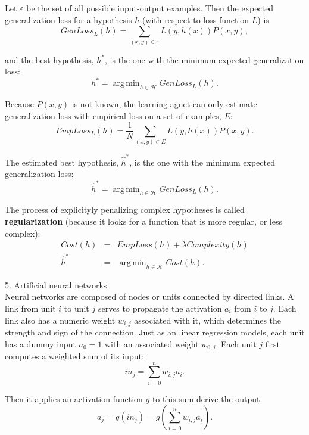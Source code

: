 \documentclass[12pt]{article}
\DeclareMathOperator*{\argmin}{arg\,min}
\begin{document}
Let $\varepsilon$ be the set of all possible input-output examples. Then the expected generalization loss for a hypothesis $h$ (with respect to loss function $L$) is
\begin{equation*}
  GenLoss_L(h) = \sum_{(x,y) \in \varepsilon} L(y,h(x)) P(x,y),
\end{equation*}

and the best hypothesis, $h^*$, is the one with the minimum expected generalization loss:
\begin{equation*}
  h^* = \argmin_{h \in \mathcal{H}} GenLoss_L (h).
\end{equation*}

Because $P(x,y)$ is not known, the learning agnet can only estimate generalization loss with empirical loss on a set of examples, $E$:
\begin{equation*}
  EmpLoss_L(h) = \frac{1}{N} \sum_{(x,y) \in E} L(y,h(x)) P(x,y).
\end{equation*}

The estimated best hypothesis, $\hat{h}^*$, is the one with the minimum expected generalization loss:
\begin{equation*}
  \hat{h}^* = \argmin_{h \in \mathcal{H}} GenLoss_L (h).
\end{equation*}

The process of explicityly penalizing complex hypotheses is called {\bf regularization} (because it looks for a function that is more regular, or less complex):
\begin{eqnarray*}
  Cost(h) &=& EmpLoss(h) + \lambda Complexity(h) \\
  \hat{h}^* &=& \argmin_{h \in \mathcal{H}} Cost(h).
\end{eqnarray*}

5. Artificial neural networks \\

Neural networks are composed of nodes or units connected by directed links. A link from unit $i$ to unit $j$ serves to propagate the activation $a_i$ from $i$ to $j$. Each link also has a numeric weight $w_{i,j}$ associated with it, which determines the strength and sign of the connection. Just as an linear regression models, each unit has a dummy input $a_0=1$ with an associated weight $w_{0,j}$. Each unit $j$ first computes a weighted sum of its input:
\begin{equation*}
  in_j = \sum^n_{i=0} w_{i,j} a_i.
\end{equation*}

Then it applies an activation function $g$ to this sum derive the output:
\begin{equation*}
  a_j = g(in_j) = g \left( \sum^n_{i=0} w_{i,j}a_i \right).
\end{equation*}
\end{document}
